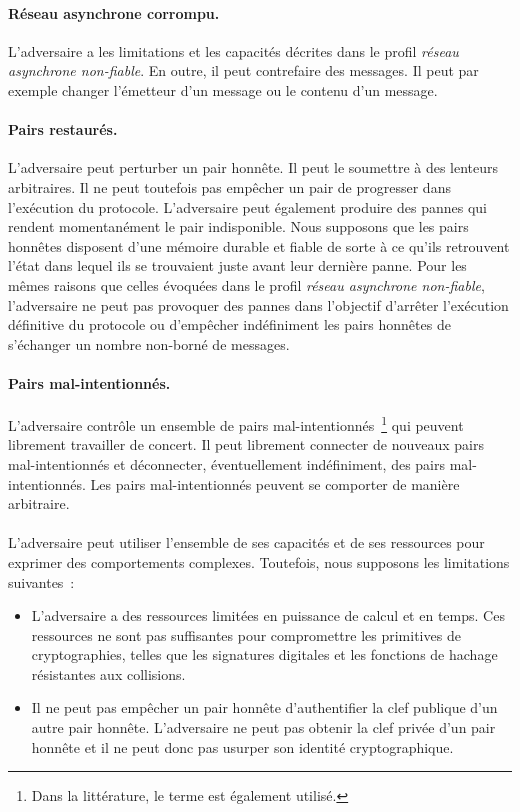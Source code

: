 \paragraph{Réseau asynchrone corrompu.} L'adversaire a les limitations et les capacités décrites dans le profil \emph{réseau asynchrone non-fiable}.
En outre, il peut contrefaire des messages.
Il peut par exemple changer l'émetteur d'un message ou le contenu d'un message.

\paragraph{Pairs restaurés.} L'adversaire peut perturber un pair honnête.
Il peut le soumettre à des lenteurs arbitraires.
Il ne peut toutefois pas empêcher un pair de progresser dans l'exécution du protocole.
L'adversaire peut également produire des pannes qui rendent momentanément le pair indisponible.
Nous supposons que les pairs honnêtes disposent d'une mémoire durable et fiable de sorte à ce qu'ils retrouvent l'état dans lequel ils se trouvaient juste avant leur dernière panne.
Pour les mêmes raisons que celles évoquées dans le profil \emph{réseau asynchrone non-fiable}, l'adversaire ne peut pas provoquer des pannes dans l'objectif d'arrêter l'exécution définitive du protocole ou d'empêcher indéfiniment les pairs honnêtes de s'échanger un nombre non-borné de messages.

\paragraph{Pairs mal-intentionnés.} L'adversaire contrôle un ensemble de pairs mal-intentionnés~\footnote{Dans la littérature, le terme  est également utilisé.} qui peuvent librement travailler de concert.
Il peut librement connecter de nouveaux pairs mal-intentionnés et déconnecter, éventuellement indéfiniment, des pairs mal-intentionnés. Les pairs mal-intentionnés peuvent se comporter de manière arbitraire.

\paragraph{}L'adversaire peut utiliser l'ensemble de ses capacités et de ses ressources pour exprimer des comportements complexes.
Toutefois, nous supposons les limitations suivantes~:

\begin{itemize}
  \item L'adversaire a des ressources limitées en puissance de calcul et en temps.
  Ces ressources ne sont pas suffisantes pour compromettre les primitives de cryptographies, telles que les signatures digitales et les fonctions de hachage résistantes aux collisions.
  \item Il ne peut pas empêcher un pair honnête d'authentifier la clef publique d'un autre pair honnête.
  L'adversaire ne peut pas obtenir la clef privée d'un pair honnête et il ne peut donc pas usurper son identité cryptographique.
\end{itemize}

